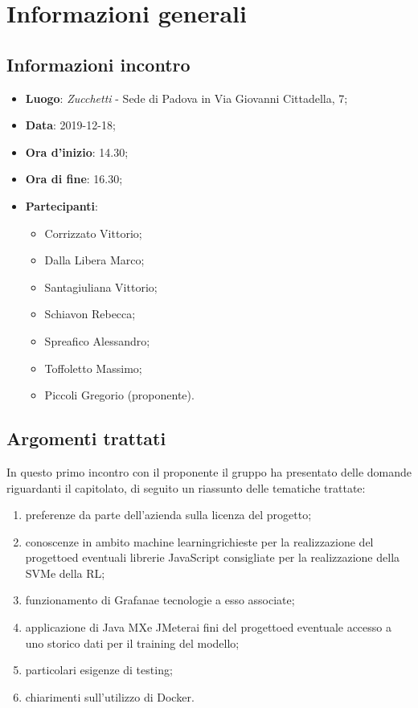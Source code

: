 \section{Informazioni generali}
    \subsection{Informazioni incontro}
        \begin{itemize}
            \item \textbf{Luogo}: \textit{Zucchetti} - Sede di Padova in Via Giovanni Cittadella, 7;
            \item \textbf{Data}: 2019-12-18;
            \item \textbf{Ora d'inizio}: 14.30;
            \item \textbf{Ora di fine}: 16.30;
            \item \textbf{Partecipanti}: \begin{itemize}
                \item Corrizzato Vittorio;
                \item Dalla Libera Marco;
                \item Santagiuliana Vittorio;
                \item Schiavon Rebecca;
                \item Spreafico Alessandro;
                \item Toffoletto Massimo;
                \item Piccoli Gregorio (proponente).
            \end{itemize}
        \end{itemize}
    \subsection{Argomenti trattati}
        In questo primo incontro con il proponente il gruppo ha presentato delle domande riguardanti il capitolato, di seguito un riassunto delle tematiche trattate:
        \begin{enumerate}
            \item preferenze da parte dell'azienda sulla licenza del progetto;
            \item conoscenze in ambito machine learning\glosp richieste per la realizzazione del progetto\glo ed eventuali librerie JavaScript consigliate per la               realizzazione della SVM\glosp e della RL\glo;
            \item funzionamento di Grafana\glosp e tecnologie a esso associate;
            \item applicazione di Java MX\glosp e JMeter\glosp ai fini del progetto\glosp ed eventuale accesso a uno storico dati per il training del modello;
            \item particolari esigenze di testing;
            \item chiarimenti sull'utilizzo di Docker.
        \end{enumerate}
